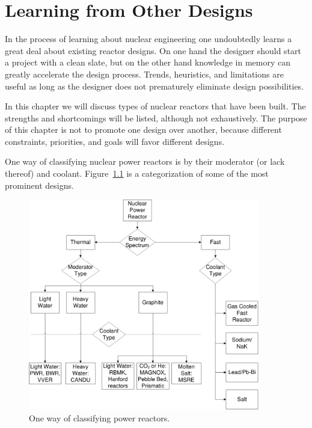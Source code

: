 \chapter{Learning from Other Designs}
In the process of learning about nuclear engineering one undoubtedly learns a great deal about existing reactor designs. On one hand the designer should start a project with a clean slate, but on the other hand knowledge in memory can greatly accelerate the design process.
Trends, heuristics, and limitations are useful as long as the designer does not prematurely eliminate design possibilities.

In this chapter we will discuss types of nuclear reactors that have been built. The strengths and shortcomings will be listed, although not exhaustively. 
The purpose of this chapter is not to promote one design over another, because different constraints, priorities, and goals will favor different designs.

One way of classifying nuclear power reactors is by their moderator (or lack thereof) and coolant. Figure~\ref{fig:classification} is a categorization of some of the most prominent designs.

\begin{figure}[!h]
  \label{fig:classification}
  \centering
  \includegraphics[width=0.90\textwidth]{graphics/RxClassification.pdf}
  \caption{One way of classifying power reactors.}
\end{figure}
\FloatBarrier

